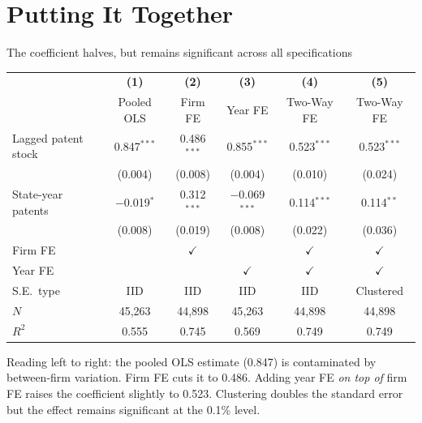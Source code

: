 \documentclass[aspectratio=169, 11pt]{beamer}
\begin{document}
\section{Putting It Together}

\begin{frame}{The coefficient halves, but remains significant across all specifications}

\vspace{0.2cm}

\begin{table}
\centering\footnotesize
\begin{tabular}{@{}lccccc@{}}
\toprule
& \textbf{(1)} & \textbf{(2)} & \textbf{(3)} & \textbf{(4)} & \textbf{(5)} \\
& Pooled OLS & Firm FE & Year FE & Two-Way FE & Two-Way FE \\
\midrule
Lagged patent stock
  & 0.847$^{***}$ & 0.486$^{***}$ & 0.855$^{***}$ & 0.523$^{***}$ & 0.523$^{***}$ \\
  & \scriptsize(0.004) & \scriptsize(0.008) & \scriptsize(0.004) & \scriptsize(0.010) & \scriptsize\alert{(0.024)} \\[4pt]
State-year patents
  & $-$0.019$^{*}$\phantom{**} & 0.312$^{***}$ & $-$0.069$^{***}$ & 0.114$^{***}$ & 0.114$^{**}$\phantom{*} \\
  & \scriptsize(0.008) & \scriptsize(0.019) & \scriptsize(0.008) & \scriptsize(0.022) & \scriptsize\alert{(0.036)} \\
\midrule
Firm FE  & & $\checkmark$ & & $\checkmark$ & $\checkmark$ \\
Year FE  & & & $\checkmark$ & $\checkmark$ & $\checkmark$ \\
S.E.\ type & IID & IID & IID & IID & Clustered \\
\midrule
$N$      & 45{,}263 & 44{,}898 & 45{,}263 & 44{,}898 & 44{,}898 \\
$R^2$    & 0.555 & 0.745 & 0.569 & 0.749 & 0.749 \\
\bottomrule
\end{tabular}
\end{table}

\vspace{0.2cm}
{\small Reading left to right: the pooled OLS estimate (0.847) is contaminated by
between-firm variation. Firm FE cuts it to 0.486. Adding year FE \textit{on
top of} firm FE raises the coefficient slightly to 0.523. Clustering doubles
the standard error but the effect remains significant at the 0.1\% level.}

\end{frame}
\end{document}
